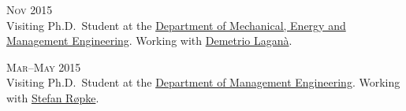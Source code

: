 \begin{paracol}{2}
  \textsc{Nov 2015}
\switchcolumn
  \\
  Visiting Ph.D.\ Student at the \href{http://www.unical.it/portale/strutture/dipartimenti_240/dimeg/}{Department of Mechanical, Energy and Management Engineering}. Working with \href{https://scholar.google.com/citations?user=r_qFOqgAAAAJ}{Demetrio Laganà}.
\end{paracol}

\begin{paracol}{2}
  \textsc{Mar--May 2015}
\switchcolumn
  \\
  Visiting Ph.D.\ Student at the \href{http://www.man.dtu.dk/english}{Department of Management Engineering}. Working with \href{https://scholar.google.com/citations?user=sYi141QAAAAJ}{Stefan Røpke}.
\end{paracol}